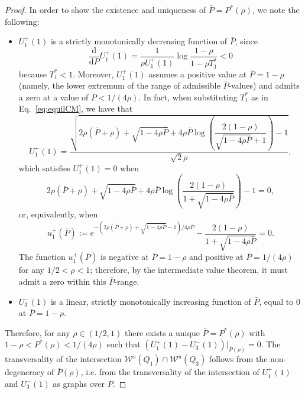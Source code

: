 \documentclass[10pt,a4paper]{amsart}
\begin{document}
\begin{proof}
In order to show the existence and uniqueness of $\bar{P}=P^\ast(\rho)$, we note the following:
\begin{itemize}
    \item $U_1^+(1)$ is a strictly monotonically decreasing function of $\bar{P}$, since
    \begin{displaymath}
        \frac{\text{d}}{\text{d} P}U_1^+(1) = \frac{1}{\rho U_1^+(1)} \log \frac{1-\rho}{1-\rho T_1^\ast} < 0 
    \end{displaymath}
    because $T_1^\ast<1$. Moreover, $U_1^+(1)$ assumes
    a positive value at $\bar{P}=1-\rho$ (namely, the lower extremum of the range of admissible $\bar{P}$-values) and admits a zero at a value of $\bar{P} < 1/(4\rho)$.
    In fact, when substituting $T_1^\ast$ as in Eq.~\eqref{eq:equilCM}, we have that
    \[
    U_1^+(1) = \frac{\sqrt{2 \rho (\bar{P} + \rho) +\sqrt{1-4 \rho \bar{P} }+4 \rho \bar{P}  \log \left(\dfrac{2(1- \rho) }{\sqrt{1-4 \rho \bar{P} }+1}\right)-1}}{\sqrt{2} \rho },
    \]
    which satisfies $U_1^+(1) = 0 $ when
    \[
    2 \rho (\bar{P} + \rho) +\sqrt{1-4 \rho \bar{P} }+4 \rho \bar{P}  \log \left(\frac{2(1- \rho) }{1+\sqrt{1-4 \rho \bar{P} }}\right)-1=0,
    \]
    or, equivalently, when
    \[
    u_1^+(\bar{P}):=e^{-(2 \rho  (\bar{P}+\rho )+\sqrt{1-4 \rho \bar{P} }-1)/4 \rho \bar{P} }-\frac{2 (1-\rho )}{1+\sqrt{1-4 \rho \bar{P} }} = 0.
    \]
    The function $u_1^+(\bar{P})$ is negative at $\bar{P}=1-\rho$ and positive at $\bar{P}=1/(4 \rho)$ for any $1/2 < \rho < 1$; therefore, by the intermediate value theorem, it must admit a zero within this $\bar{P}$-range. 
    \item $U_3^-(1)$ is a linear, strictly monotonically increasing function of $\bar{P}$, equal to $0$ at $\bar{P}=1-\rho$.
\end{itemize}
Therefore, for any $\rho \in \left(1/2, 1 \right)$ there exists a unique $\bar{P}=P^\ast(\rho)$ with $1-\rho < P^\ast(\rho) < 1/(4\rho)$ such that $(U_1^+(1)-U_3^-(1))|_{\bar{P}(\rho)} = 0$. The transversality of the intersection $\mathcal{W}^{s}(Q_1) \cap \mathcal{W}^{u}(Q_3)$ follows from the non-degeneracy of $\bar{P}(\rho)$, i.e. from the transversality of the intersection of $U_1^+(1)$ and $U_3^-(1)$ as graphs over $P$.
\end{proof}
\end{document}
